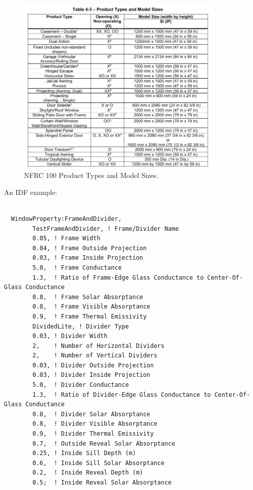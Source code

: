 \begin{figure}[hbtp] %
\centering
\includegraphics[width=0.9\textwidth, height=0.9\textheight, keepaspectratio=true]{media/NFRC100-Table4-3.PNG}
\caption{NFRC 100 Product Types and Model Sizes. \protect \label{fig:nfrc100-product-types}}
\end{figure}

An IDF example:

\begin{lstlisting}

  WindowProperty:FrameAndDivider,
        TestFrameAndDivider, ! Frame/Divider Name
        0.05, ! Frame Width
        0.04, ! Frame Outside Projection
        0.03, ! Frame Inside Projection
        5.0,  ! Frame Conductance
        1.3,  ! Ratio of Frame-Edge Glass Conductance to Center-Of-Glass Conductance
        0.8,  ! Frame Solar Absorptance
        0.8,  ! Frame Visible Absorptance
        0.9,  ! Frame Thermal Emissivity
        DividedLite, ! Divider Type
        0.03, ! Divider Width
        2,    ! Number of Horizontal Dividers
        2,    ! Number of Vertical Dividers
        0.03, ! Divider Outside Projection
        0.03, ! Divider Inside Projection
        5.0,  ! Divider Conductance
        1.3,  ! Ratio of Divider-Edge Glass Conductance to Center-Of-Glass Conductance
        0.8,  ! Divider Solar Absorptance
        0.8,  ! Divider Visible Absorptance
        0.9,  ! Divider Thermal Emissivity
        0.7,  ! Outside Reveal Solar Absorptance
        0.25, ! Inside Sill Depth (m)
        0.6,  ! Inside Sill Solar Absorptance
        0.2,  ! Inside Reveal Depth (m)
        0.5;  ! Inside Reveal Solar Absorptance
\end{lstlisting}

